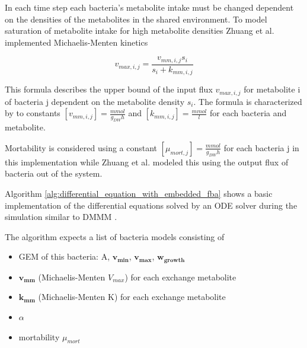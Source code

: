 \documentclass[a4paper,10pt]{article}
\begin{document}
In each time step each bacteria's metabolite intake must be changed dependent on the densities of the metabolites in the shared environment.
To model saturation of metabolite intake for high metabolite densities Zhuang et al. implemented Michaelis-Menten kinetics \cite{johnson2011original}

\begin{equation} \label{eq:michaelis-menten}
 v_{max,i,j} = \frac{v_{mm,i,j} s_i}{s_i + k_{mm,i,j}}
\end{equation}

This formula describes the upper bound of the input flux $v_{max,i,j}$ for metabolite i of bacteria j dependent on the metabolite density
$s_i$. The formula is characterized by to constants $\left[ v_{mm,i,j} \right] = \frac{mmol}{g_{DW} h}$ and $\left[ k_{mm,i,j} \right] = \frac{mmol}{l}$
for each bacteria and metabolite.

Mortability is considered using a constant $\left[ \mu_{mort,j} \right] = \frac{mmol}{g_{DW} h}$ for each bacteria j in this implementation while Zhuang et al. modeled this
using the output flux of bacteria out of the system.


Algorithm \ref{alg:differential_equation_with_embedded_fba} shows a basic implementation of the differential equations solved by an ODE
solver during the simulation similar to DMMM \cite{zhuang_genome-scale_2011}.

The algorithm expects a list of bacteria models consisting of
\begin{itemize}
 \item GEM of this bacteria: A, $\bm{v_{min}}$, $\bm{v_{max}}$, $\bm{w_{growth}}$
 \item $\bm{v_{mm}}$ (Michaelis-Menten $V_{max}$) for each exchange metabolite
 \item $\bm{k_{mm}}$ (Michaelis-Menten K) for each exchange metabolite
 \item $\alpha$
 \item mortability $\mu_{mort}$
\end{itemize}
\end{document}

